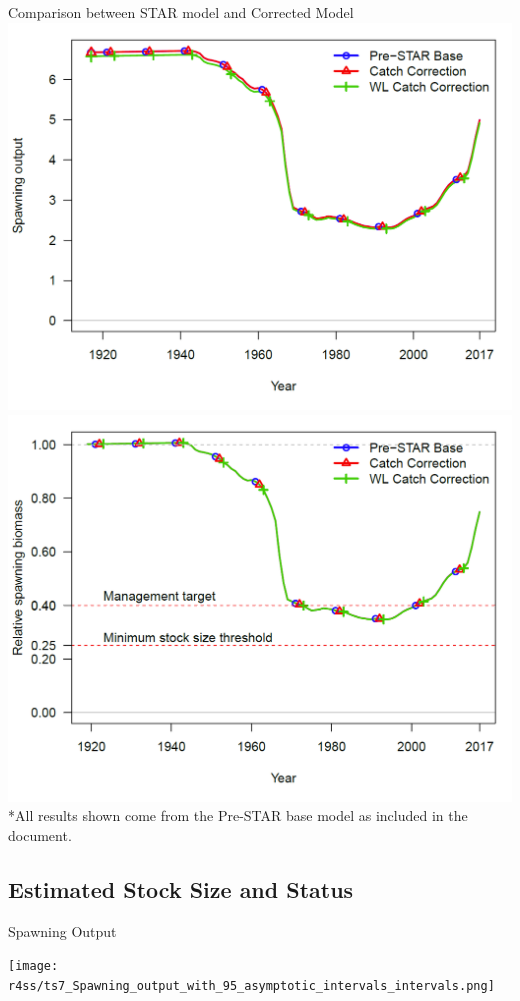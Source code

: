 \documentclass[pdf]{beamer}\usepackage[]{graphicx}\usepackage[]{color}
\begin{document}
\begin{frame}{Comparison between STAR model and Corrected Model}
  \includegraphics[scale = 0.20]{figures/12_0_vs_13_0_ssb.png}
  \includegraphics[scale = 0.20]{figures/12_0_vs_13_0_dep.png}
  \\
  *All results shown come from the Pre-STAR base model as included in the document.
\end{frame}


\subsection{Estimated Stock Size and Status}
\begin{frame}{Spawning Output}
  \begin{center}
    \texttt{[image: r4ss/ts7\_Spawning\_output\_with\_95\_asymptotic\_intervals\_intervals.png]}
  \end{center}
\end{frame}
\end{document}
